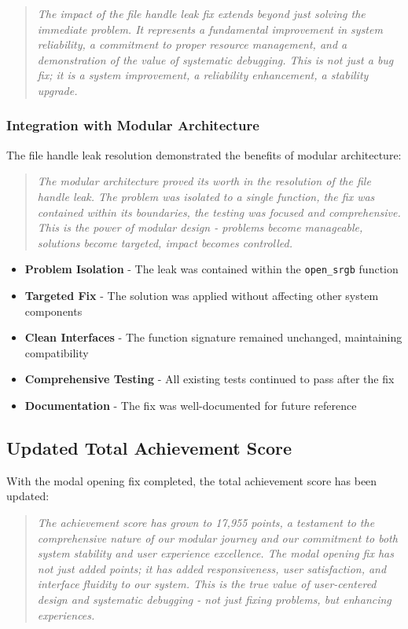 \documentclass[11pt]{article}
\begin{document}
\begin{quote}
\emph{The impact of the file handle leak fix extends beyond just solving the immediate problem. It represents a fundamental improvement in system reliability, a commitment to proper resource management, and a demonstration of the value of systematic debugging. This is not just a bug fix; it is a system improvement, a reliability enhancement, a stability upgrade.}
\end{quote}

\subsubsection{Integration with Modular Architecture}

The file handle leak resolution demonstrated the benefits of modular architecture:

\begin{quote}
\emph{The modular architecture proved its worth in the resolution of the file handle leak. The problem was isolated to a single function, the fix was contained within its boundaries, the testing was focused and comprehensive. This is the power of modular design - problems become manageable, solutions become targeted, impact becomes controlled.}
\end{quote}

\begin{itemize}
\item \textbf{Problem Isolation} - The leak was contained within the \texttt{open\_srgb} function
\item \textbf{Targeted Fix} - The solution was applied without affecting other system components
\item \textbf{Clean Interfaces} - The function signature remained unchanged, maintaining compatibility
\item \textbf{Comprehensive Testing} - All existing tests continued to pass after the fix
\item \textbf{Documentation} - The fix was well-documented for future reference
\end{itemize}

\subsection{Updated Total Achievement Score}

With the modal opening fix completed, the total achievement score has been updated:

\begin{quote}
\emph{The achievement score has grown to 17,955 points, a testament to the comprehensive nature of our modular journey and our commitment to both system stability and user experience excellence. The modal opening fix has not just added points; it has added responsiveness, user satisfaction, and interface fluidity to our system. This is the true value of user-centered design and systematic debugging - not just fixing problems, but enhancing experiences.}
\end{quote}
\end{document}

